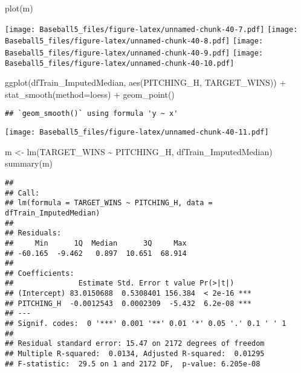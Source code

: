 \documentclass[
]{article}
\newenvironment{Shaded}{\begin{snugshade}}{\end{snugshade}}
\newcommand{\AttributeTok}[1]{\textcolor[rgb]{0.77,0.63,0.00}{#1}}
\newcommand{\FunctionTok}[1]{\textcolor[rgb]{0.00,0.00,0.00}{#1}}
\newcommand{\NormalTok}[1]{#1}
\newcommand{\OtherTok}[1]{\textcolor[rgb]{0.56,0.35,0.01}{#1}}
\newcommand{\SpecialCharTok}[1]{\textcolor[rgb]{0.00,0.00,0.00}{#1}}
\begin{document}
\begin{Shaded}
\begin{Highlighting}[]
\FunctionTok{plot}\NormalTok{(m)}
\end{Highlighting}
\end{Shaded}

\texttt{[image: Baseball5\_files/figure-latex/unnamed-chunk-40-7.pdf]}
\texttt{[image: Baseball5\_files/figure-latex/unnamed-chunk-40-8.pdf]}
\texttt{[image: Baseball5\_files/figure-latex/unnamed-chunk-40-9.pdf]}
\texttt{[image: Baseball5\_files/figure-latex/unnamed-chunk-40-10.pdf]}

\begin{Shaded}
\begin{Highlighting}[]
\FunctionTok{ggplot}\NormalTok{(dfTrain\_ImputedMedian, }\FunctionTok{aes}\NormalTok{(PITCHING\_H, TARGET\_WINS)) }\SpecialCharTok{+}
          \FunctionTok{stat\_smooth}\NormalTok{(}\AttributeTok{method=}\NormalTok{loess) }\SpecialCharTok{+}
          \FunctionTok{geom\_point}\NormalTok{()}
\end{Highlighting}
\end{Shaded}

\begin{verbatim}
## `geom_smooth()` using formula 'y ~ x'
\end{verbatim}

\texttt{[image: Baseball5\_files/figure-latex/unnamed-chunk-40-11.pdf]}

\begin{Shaded}
\begin{Highlighting}[]
\NormalTok{m }\OtherTok{\textless{}{-}} \FunctionTok{lm}\NormalTok{(TARGET\_WINS }\SpecialCharTok{\textasciitilde{}}\NormalTok{ PITCHING\_H, dfTrain\_ImputedMedian)}
\FunctionTok{summary}\NormalTok{(m)}
\end{Highlighting}
\end{Shaded}

\begin{verbatim}
## 
## Call:
## lm(formula = TARGET_WINS ~ PITCHING_H, data = dfTrain_ImputedMedian)
## 
## Residuals:
##     Min      1Q  Median      3Q     Max 
## -60.165  -9.462   0.897  10.651  68.914 
## 
## Coefficients:
##               Estimate Std. Error t value Pr(>|t|)    
## (Intercept) 83.0150688  0.5308401 156.384  < 2e-16 ***
## PITCHING_H  -0.0012543  0.0002309  -5.432  6.2e-08 ***
## ---
## Signif. codes:  0 '***' 0.001 '**' 0.01 '*' 0.05 '.' 0.1 ' ' 1
## 
## Residual standard error: 15.47 on 2172 degrees of freedom
## Multiple R-squared:  0.0134, Adjusted R-squared:  0.01295 
## F-statistic:  29.5 on 1 and 2172 DF,  p-value: 6.205e-08
\end{verbatim}
\end{document}
